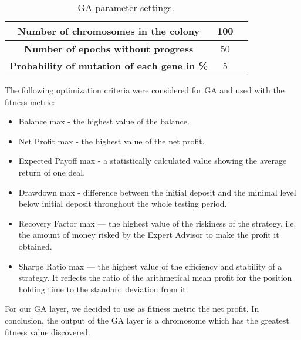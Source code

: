 \begin{table}[htb]
\centering
\begin{tabular}{|c|c|c|}
\hline 
\textbf{Number of chromosomes in the colony} & 100 \\ 
\hline 
\textbf{Number of epochs without progress} &  50\\ 
\hline 
\textbf{Probability of mutation of each gene in \%} &  5\\  
\hline 
\end{tabular} 
\caption{\label{tab:GAPS}GA parameter settings.}
\end{table}


The following optimization criteria were considered for GA and used with the fitness metric:
\begin{itemize}
\setlength\itemsep{0.3em}
\item Balance max - the highest value of the balance.
\item Net Profit max - the highest value of the net profit.
\item Expected Payoff max - a statistically calculated value showing the average return of one deal.
\item Drawdown max - difference between the initial deposit and the minimal level below initial deposit throughout the whole testing period.
\item Recovery Factor max — the highest value of the riskiness of the strategy, i.e. the amount of money risked by the Expert Advisor to make the profit it obtained.
\item Sharpe Ratio max — the highest value of the efficiency and stability of a strategy. It reflects the ratio of the arithmetical mean profit for the position holding time to the standard deviation from it.
\end{itemize}

For our GA layer, we decided to use as fitness metric the net profit.
In conclusion, the output of the GA layer is a chromosome which has the greatest fitness value discovered.

